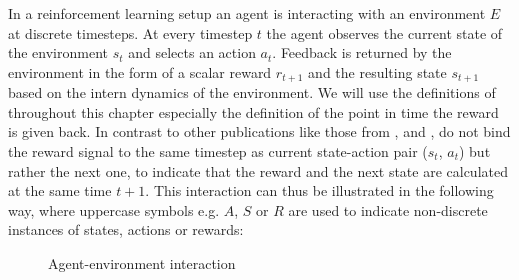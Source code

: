 In a reinforcement learning setup an agent is interacting with an environment $E$ at discrete timesteps. At every timestep $t$ the agent observes the current state of the environment $s_t$ and selects an action $a_t$. Feedback is returned by the environment in the form of a scalar reward $r_{t+1}$ and the resulting state $s_{t+1}$ based on the intern dynamics of the environment. We will use the definitions of \cite{Sutton1998} throughout this chapter especially the definition of the point in time the reward is given back. In contrast to other publications like those from \cite{zare2021continuous}, \cite{wiering2012reinforcement} and \cite{lillicrap2019continuous}, \cite{Sutton1998} do not bind the reward signal to the same timestep as current state-action pair ($s_t$, $a_t$) but rather the next one, to indicate that the reward and the next state are calculated at the same time $t+1$.
This interaction can thus be illustrated in the following way, where uppercase symbols e.g. $A$, $S$ or $R$ are used to indicate non-discrete instances of states, actions or rewards:
\begin{figure}[H]
    \centering
    \hspace*{1cm}%
    \caption{Agent-environment interaction}
    \label{fig:rlEnvironment}
\end{figure}



